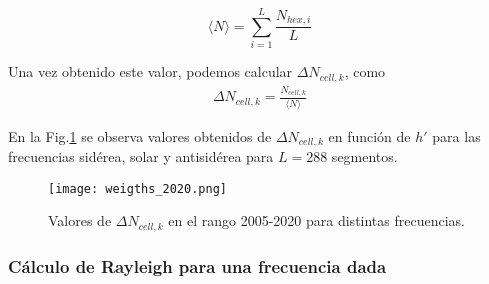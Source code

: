 \begin{enumerate}
       \begin{equation}
         \langle N \rangle = \sum^{L}_{i=1} \frac{N_{hex, i}}{L}
       \end{equation}
       
       Una vez obtenido este valor, podemos calcular  $\Delta N_{cell,k}$, como 
      \begin{align}
         \Delta N_{cell,k} = \frac{N_{cell, k}}{\langle N \rangle}
      \end{align} 
      \end{enumerate}

      En la Fig.\ref{fig:pesos_ejemplo} se observa valores obtenidos de $\Delta N_{cell,k}$ en función de $h'$ para las frecuencias sidérea, solar y antisidérea para $L=288$ segmentos.

        \begin{figure}[H]
          \centering
              \texttt{[image: weigths\_2020.png]}
              \caption{Valores de $\Delta N_{cell, k}$ en el rango 2005-2020 para distintas frecuencias.}
              \label{fig:pesos_ejemplo}
        \end{figure}

  \subsubsection{Cálculo de Rayleigh para una frecuencia dada}

